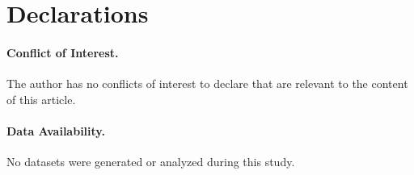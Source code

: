 \documentclass[11pt,a4paper]{article}
\theoremstyle{plain}
\theoremstyle{definition}
\theoremstyle{remark}
\begin{document}
\section*{Declarations}

\paragraph{Conflict of Interest.} The author has no conflicts of interest to declare that are relevant to the content of this article.

\paragraph{Data Availability.} No datasets were generated or analyzed during this study.



\end{document}
